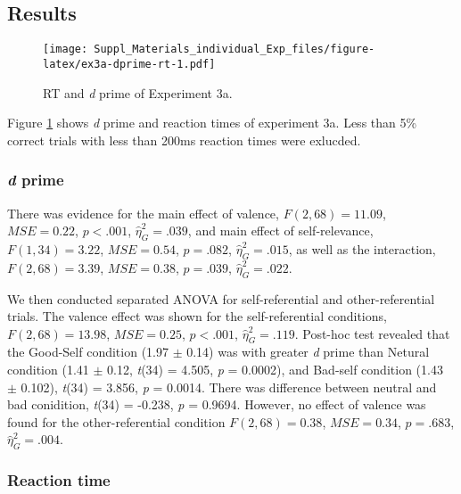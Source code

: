 \documentclass[man]{apa6}
\begin{document}
\hypertarget{results-4}{%
\subsection{Results}\label{results-4}}

\begin{figure}
\centering
\texttt{[image: Suppl\_Materials\_individual\_Exp\_files/figure-latex/ex3a-dprime-rt-1.pdf]}
\caption{\label{fig:ex3a-dprime-rt}RT and \emph{d} prime of Experiment 3a.}
\end{figure}

Figure \ref{fig:ex3a-dprime-rt} shows \emph{d} prime and reaction times of experiment 3a. Less than 5\% correct trials with less than 200ms reaction times were exlucded.

\hypertarget{d-prime-2}{%
\subsubsection{\texorpdfstring{\emph{d} prime}{d prime}}\label{d-prime-2}}

There was evidence for the main effect of valence, \(F(2, 68) = 11.09\), \(\mathit{MSE} = 0.22\), \(p < .001\), \(\hat{\eta}^2_G = .039\), and main effect of self-relevance, \(F(1, 34) = 3.22\), \(\mathit{MSE} = 0.54\), \(p = .082\), \(\hat{\eta}^2_G = .015\), as well as the interaction, \(F(2, 68) = 3.39\), \(\mathit{MSE} = 0.38\), \(p = .039\), \(\hat{\eta}^2_G = .022\).

We then conducted separated ANOVA for self-referential and other-referential trials. The valence effect was shown for the self-referential conditions, \(F(2, 68) = 13.98\), \(\mathit{MSE} = 0.25\), \(p < .001\), \(\hat{\eta}^2_G = .119\). Post-hoc test revealed that the Good-Self condition (1.97 \(\pm\) 0.14) was with greater \emph{d} prime than Netural condition (1.41 \(\pm\) 0.12, \emph{t}(34) = 4.505, \emph{p} = 0.0002), and Bad-self condition (1.43 \(\pm\) 0.102), \emph{t}(34) = 3.856, \emph{p} = 0.0014. There was difference between neutral and bad conidition, \emph{t}(34) = -0.238, \emph{p} = 0.9694. However, no effect of valence was found for the other-referential condition \(F(2, 68) = 0.38\), \(\mathit{MSE} = 0.34\), \(p = .683\), \(\hat{\eta}^2_G = .004\).

\hypertarget{reaction-time-3}{%
\subsubsection{Reaction time}\label{reaction-time-3}}
\end{document}
